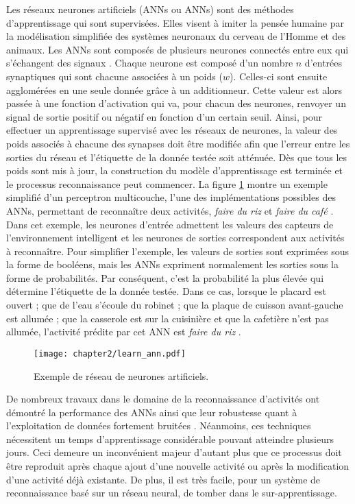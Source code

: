 Les réseaux neurones artificiels (\aclp{ANN} ou \acsp{ANN}) sont des méthodes d’apprentissage qui sont supervisées. Elles visent à imiter la pensée humaine par la modélisation simplifiée des systèmes neuronaux du cerveau de l’Homme et des animaux. Les \acsp{ANN} sont composés de plusieurs neurones connectés entre eux qui s’échangent des signaux \citep{Witten2016}. Chaque neurone est composé d'un nombre $n$ d'entrées synaptiques qui sont chacune associées à un poids ($w$). Celles-ci sont ensuite agglomérées en une seule donnée grâce à un additionneur. Cette valeur est alors passée à une fonction d'activation qui va, pour chacun des neurones, renvoyer un signal de sortie positif ou négatif en fonction d'un certain seuil. Ainsi, pour effectuer un apprentissage supervisé avec les réseaux de neurones, la valeur des poids associés à chacune des synapses doit être modifiée afin que l’erreur entre les sorties du réseau et l'étiquette de la donnée testée soit atténuée. Dès que tous les poids sont mis à jour, la construction du modèle d'apprentissage est terminée et le processus reconnaissance peut commencer. La figure \ref{fig:learn_ann} montre un exemple simplifié d'un perceptron multicouche, l'une des implémentations possibles des \acsp{ANN}, permettant de reconnaître deux activités, \og \textit{faire du riz} \fg et \og \textit{faire du café} \fg. Dans cet exemple, les neurones d'entrée admettent les valeurs des capteurs de l'environnement intelligent et les neurones de sorties correspondent aux activités à reconnaître. Pour simplifier l'exemple, les valeurs de sorties sont exprimées sous la forme de booléens, mais les \acsp{ANN} expriment normalement les sorties sous la forme de probabilités. Par conséquent, c'est la probabilité la plus élevée qui détermine l'étiquette de la donnée testée. Dans ce cas, lorsque le placard est ouvert ; que de l'eau s'écoule du robinet ; que la plaque de cuisson avant-gauche est allumée ; que la casserole est sur la cuisinière et que la cafetière n'est pas allumée, l'activité prédite par cet \acs{ANN} est \og \textit{faire du riz} \fg.

\begin{figure}[H]
	\centering
	\texttt{[image: chapter2/learn\_ann.pdf]}
	\caption{Exemple de réseau de neurones artificiels.}
	\label{fig:learn_ann}
\end{figure}

De nombreux travaux dans le domaine de la reconnaissance d'activités ont démontré la performance des \acsp{ANN} ainsi que leur robustesse quant à l'exploitation de données fortement bruitées \citep{Parkka2006, Delachaux2013}. Néanmoins, ces techniques nécessitent un temps d'apprentissage considérable pouvant atteindre plusieurs jours. Ceci demeure un inconvénient majeur d'autant plus que ce processus doit être reproduit après chaque ajout d'une nouvelle activité ou après la modification d'une activité déjà existante. De plus, il est très facile, pour un système de reconnaissance basé sur un réseau neural, de tomber dans le sur-apprentissage.

